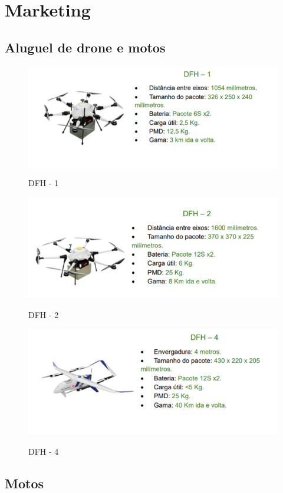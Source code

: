 \chapter{Marketing}
\label{ch:identificador}

\section{Aluguel de drone e motos}

\begin{figure} [!ht]
   { \centering
    \caption{DFH - 1}
    \includegraphics[width=0.6\linewidth]{figuras/drone dfh1.png}
    \label{fig:enter-label}
    }
\end{figure}

\begin{figure}[!ht]
   { \centering
    \caption{DFH - 2}
    \includegraphics[width=0.6\linewidth]{figuras/drone dfh2.png}
    \label{fig:enter-label}
    }
\end{figure}

\begin{figure}[!ht]
   { \centering
    \caption{DFH - 4}
    \includegraphics[width=0.6\linewidth]{figuras/drone dfh4.png}
    \label{fig:enter-label}
    }
\end{figure}

\section{Motos}

